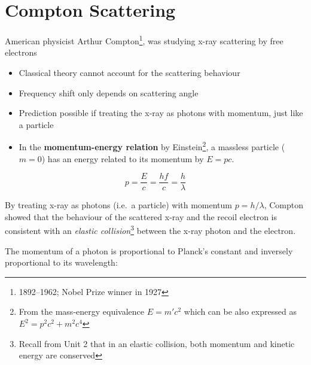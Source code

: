 \section{Compton Scattering}


American physicist Arthur Compton\footnote{1892--1962; Nobel Prize winner in
1927}, was studying x-ray scattering by free electrons
\begin{itemize}
\item Classical theory cannot account for the scattering behaviour
\item Frequency shift only depends on scattering angle
\item Prediction possible if treating the x-ray as photons with
  momentum, just like a particle
\item In the \textbf{momentum-energy relation} by Einstein\footnote{From
the mass-energy equivalence $E=m'c^2$ which can be also expressed as
$E^2=p^2c^2+m^2c^4$}, a massless particle ($m=0$) has an energy related
  to its momentum by $E=pc$.
\end{itemize}

\begin{equation}
  \boxed{
    p=\frac Ec=\frac{hf}c=\frac h\lambda
  }
\end{equation}




By treating x-ray as photons (i.e.\ a particle) with momentum $p=h/\lambda$,
Compton showed that the behaviour of the scattered x-ray and the recoil
electron is consistent with an \emph{elastic collision}\footnote{Recall from
Unit 2 that in an elastic collision, both momentum and kinetic energy are
conserved} between the x-ray photon and the electron.
\begin{center}
\end{center}
%
%
%
%
The momentum of a photon is proportional to Planck's constant and inversely
proportional to its wavelength:
%



